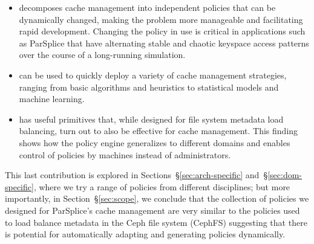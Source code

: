 \begin{itemize}

  \item decomposes cache management into independent policies that can be
  dynamically changed, making the problem more manageable and facilitating rapid
  development. Changing the policy in use is critical in applications such as
  ParSplice that have alternating stable and chaotic keyspace access patterns
  over the course of a long-running simulation.  

  \item can be used to quickly deploy a variety of cache management strategies,
  ranging from basic algorithms and heuristics to statistical models and machine
  learning.

  \item has useful primitives that, while designed for file system metadata
  load balancing, turn out to also be effective for cache management. This
  finding shows how the policy engine generalizes to different domains and
  enables control of policies by machines instead of administrators.

\end{itemize}


This last contribution is explored in Sections~\S\ref{sec:arch-specific}
and~\S\ref{sec:dom-specific}, where we try a range of policies from different
disciplines; but more importantly, in Section~\S\ref{sec:scope}, we conclude
that the collection of policies we designed for ParSplice's cache management
are very similar to the policies used to load balance metadata in the Ceph file
system (CephFS) suggesting that there is potential for automatically adapting
and generating policies dynamically. 


